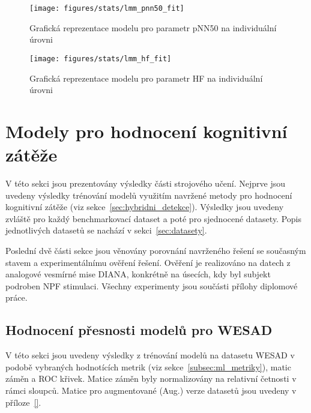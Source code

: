 \begin{figure}[!htb]
    \begin{center}
        \texttt{[image: figures/stats/lmm\_pnn50\_fit]}
        \caption{Grafická reprezentace modelu pro parametr pNN50 na individuální úrovni}
        \label{fig:results_lmm_fit3}
    \end{center}
\end{figure}

\begin{figure}[!htb]
    \begin{center}
        \texttt{[image: figures/stats/lmm\_hf\_fit]}
        \caption{Grafická reprezentace modelu pro parametr HF na individuální úrovni}
        \label{fig:results_lmm_fit4}
    \end{center}
\end{figure}



\section{Modely pro hodnocení kognitivní zátěže}
\label{sec:vysledky_detekce_cl}
V této sekci jsou prezentovány výsledky části strojového učení. Nejprve jsou
uvedeny výsledky trénování modelů využitím navržené metody pro hodnocení
kognitivní zátěže (viz sekce~\ref{sec:hybridni_detekce}). Výsledky jsou uvedeny
zvláště pro každý benchmarkovací dataset a poté pro sjednocené datasety. Popis
jednotlivých datasetů se nachází v sekci~\ref{sec:datasety}. 

Poslední dvě části sekce jsou věnovány porovnání navrženého řešení se současným
stavem a experimentálnímu ověření řešení. Ověření je realizováno na datech z
analogové vesmírné mise DIANA, konkrétně na úsecích, kdy byl subjekt podroben
\gls{NPF} stimulaci. Všechny experimenty jsou součásti přílohy diplomové práce.

\subsection{Hodnocení přesnosti modelů pro WESAD}
\label{subsec:wesad_models}
V této sekci jsou uvedeny výsledky z trénování modelů na datasetu WESAD v podobě
vybraných hodnotících metrik (viz sekce~\ref{subsec:ml_metriky}), matic záměn a
ROC křivek. Matice záměn byly normalizovány na relativní četnosti v rámci
sloupců. Matice pro augmentované (Aug.) verze datasetů jsou uvedeny v
příloze~\ref{}.


